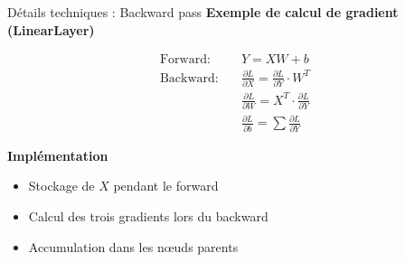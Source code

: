 \documentclass[aspectratio=169,xcolor=dvipsnames]{beamer}
\begin{document}
\begin{frame}{Détails techniques : Backward pass}
\textbf{Exemple de calcul de gradient (LinearLayer)}

\begin{align*}
\text{Forward:} \quad & Y = XW + b \\
\text{Backward:} \quad & \frac{\partial L}{\partial X} = \frac{\partial L}{\partial Y} \cdot W^T \\
& \frac{\partial L}{\partial W} = X^T \cdot \frac{\partial L}{\partial Y} \\
& \frac{\partial L}{\partial b} = \sum \frac{\partial L}{\partial Y}
\end{align*}

\vspace{0.5cm}

\textbf{Implémentation}
\begin{itemize}
    \item Stockage de $X$ pendant le forward
    \item Calcul des trois gradients lors du backward
    \item Accumulation dans les nœuds parents
\end{itemize}
\end{frame}
\end{document}
